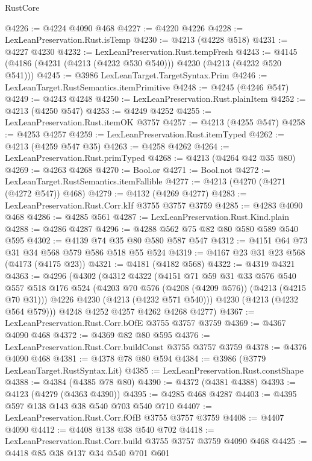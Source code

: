 \begin{lexlean}{RustCore}
\begin{coremodule}
@4226 := @4224 @4090 @468
@4227 := @4220 @4226
@4228 := LexLeanPreservation.Rust.isTemp
@4230 := @4213 (@4228 @518)
@4231 := @4227 @4230
@4232 := LexLeanPreservation.Rust.tempFresh
@4243 := @4145 (@4186 (@4231 (@4213 (@4232 @530 @540))) @4230 (@4213 (@4232 @520 @541)))
@4245 := @3986 LexLeanTarget.TargetSyntax.Prim
@4246 := LexLeanTarget.RustSemantics.itemPrimitive
@4248 := @4245 (@4246 @547)
@4249 := @4243 @4248
@4250 := LexLeanPreservation.Rust.plainItem
@4252 := @4213 (@4250 @547)
@4253 := @4249 @4252
@4255 := LexLeanPreservation.Rust.itemOK @3757
@4257 := @4213 (@4255 @547)
@4258 := @4253 @4257
@4259 := LexLeanPreservation.Rust.itemTyped
@4262 := @4213 (@4259 @547 @35)
@4263 := @4258 @4262
@4264 := LexLeanPreservation.Rust.primTyped
@4268 := @4213 (@4264 @42 @35 @80)
@4269 := @4263 @4268
@4270 := Bool.or
@4271 := Bool.not
@4272 := LexLeanTarget.RustSemantics.itemFallible
@4277 := @4213 (@4270 (@4271 (@4272 @547)) @468)
@4279 := @4132 (@4269 @4277)
@4283 := LexLeanPreservation.Rust.Corr.kIf @3755 @3757 @3759
@4285 := @4283 @4090 @468
@4286 := @4285 @561
@4287 := LexLeanPreservation.Rust.Kind.plain
@4288 := @4286 @4287
@4296 := @4288 @562 @75 @82 @80 @580 @589 @540 @595
@4302 := @4139 @74 @35 @80 @580 @587 @547
@4312 := @4151 @64 @73 @31 @34 @568 @579 @586 @518 @55 @524
@4319 := @4167 @23 @31 @23 @568 (@4173 (@4175 @23))
@4321 := @4181 (@4182 @568)
@4322 := @4319 @4321
@4363 := @4296
    (@4302
      (@4312
        @4322
        (@4151
          @71
          @59
          @31
          @33
          @576
          @540
          @557
          @518
          @176
          @524
          (@4203 @70 @576 (@4208 (@4209 @576)) (@4213 (@4215 @70 @31)))
          @4226
          @4230
          (@4213 (@4232 @571 @540)))
        @4230
        (@4213 (@4232 @564 @579)))
      @4248
      @4252
      @4257
      @4262
      @4268
      @4277)
@4367 := LexLeanPreservation.Rust.Corr.bOfE @3755 @3757 @3759
@4369 := @4367 @4090 @468
@4372 := @4369 @82 @80 @595
@4376 := LexLeanPreservation.Rust.Corr.buildConst @3755 @3757 @3759
@4378 := @4376 @4090 @468
@4381 := @4378 @78 @80 @594
@4384 := @3986 (@3779 LexLeanTarget.RustSyntax.Lit)
@4385 := LexLeanPreservation.Rust.constShape
@4388 := @4384 (@4385 @78 @80)
@4390 := @4372 (@4381 @4388)
@4393 := @4123 (@4279 (@4363 @4390))
@4395 := @4285 @468 @4287
@4403 := @4395 @597 @138 @143 @38 @540 @703 @540 @710
@4407 := LexLeanPreservation.Rust.Corr.fOfB @3755 @3757 @3759
@4408 := @4407 @4090
@4412 := @4408 @138 @38 @540 @702
@4418 := LexLeanPreservation.Rust.Corr.build @3755 @3757 @3759 @4090 @468
@4425 := @4418 @85 @38 @137 @34 @540 @701 @601

\end{coremodule}
\end{lexlean}
